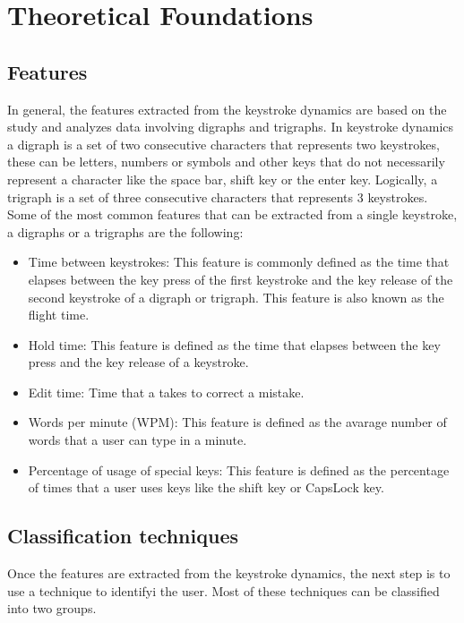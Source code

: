 \section{Theoretical Foundations}
\label{sec:theoretical-foundations}

\subsection{Features}

In general, the features extracted from the keystroke dynamics are based on the study and analyzes data involving digraphs and trigraphs. In keystroke dynamics a digraph is a set of two consecutive characters that represents two keystrokes, these can be letters, numbers or symbols and other keys that do not necessarily represent a character like the space bar, shift key or the enter key. Logically, a trigraph is a set of three consecutive characters that represents 3 keystrokes.
Some of the most common features that can be extracted from a single keystroke, a digraphs or a trigraphs are the following:
\begin{itemize}
	\item Time between keystrokes: This feature is commonly defined as the time that elapses between the key press of the first keystroke and the key release of the second keystroke of a digraph or trigraph. This feature is also known as the flight time.
	\item Hold time: This feature is defined as the time that elapses between the key press and the key release of a keystroke.
	\item Edit time: Time that a takes to correct a mistake.
	\item Words per minute (WPM): This feature is defined as the avarage number of words that a user can type in a minute.
	\item Percentage of usage of special keys: This feature is defined as the percentage of times that a user uses keys like the shift key or CapsLock key.
\end{itemize}

\subsection{Classification techniques}

Once the features are extracted from the keystroke dynamics, the next step is to use a technique to identifyi the user. Most of these techniques can be classified into two groups.



